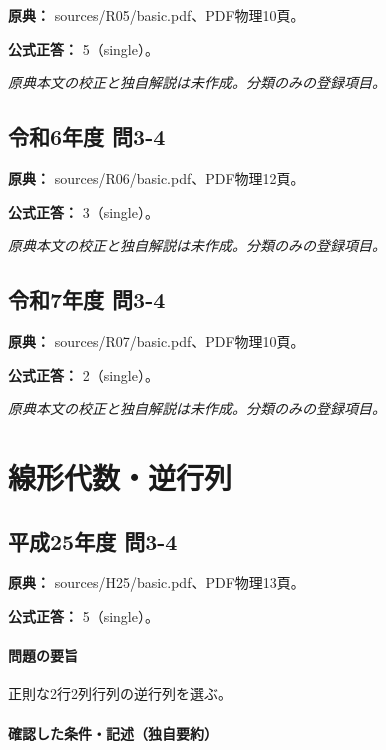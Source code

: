 \noindent\textbf{原典：} sources/R05/basic.pdf、PDF物理10頁。

\textbf{公式正答：} 5（single）。

\par\textit{原典本文の校正と独自解説は未作成。分類のみの登録項目。}

\subsection{令和6年度 問3-4}
\label{q:r06-reg-basic-3-4}

\noindent\textbf{原典：} sources/R06/basic.pdf、PDF物理12頁。

\textbf{公式正答：} 3（single）。

\par\textit{原典本文の校正と独自解説は未作成。分類のみの登録項目。}

\subsection{令和7年度 問3-4}
\label{q:r07-reg-basic-3-4}

\noindent\textbf{原典：} sources/R07/basic.pdf、PDF物理10頁。

\textbf{公式正答：} 2（single）。

\par\textit{原典本文の校正と独自解説は未作成。分類のみの登録項目。}

\section{線形代数・逆行列}

\subsection{平成25年度 問3-4}
\label{q:h25-reg-basic-3-4}

\noindent\textbf{原典：} sources/H25/basic.pdf、PDF物理13頁。

\textbf{公式正答：} 5（single）。

\paragraph{問題の要旨} 正則な2行2列行列の逆行列を選ぶ。

\paragraph{確認した条件・記述（独自要約）}\mbox{}\par


